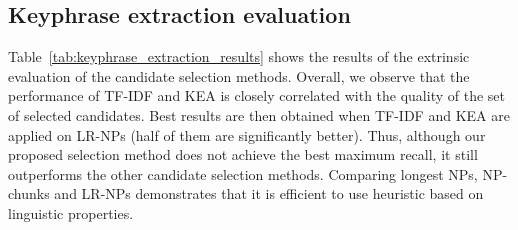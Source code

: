     \subsection{Keyphrase extraction evaluation}
    \label{subsec:keyphrase_extraction_evaluation}
        Table~\ref{tab:keyphrase_extraction_results} shows the results of the extrinsic evaluation of the candidate selection methods.
        Overall, we observe that the performance of TF-IDF and KEA is closely correlated with the quality of the set of selected candidates.
        Best results are then obtained when TF-IDF and KEA are applied on LR-NPs (half of them are significantly better).
        Thus, although our proposed selection method does not achieve the best maximum recall, it still outperforms the other candidate selection  methods.
        Comparing longest NPs, NP-chunks and LR-NPs demonstrates that it is efficient to use heuristic based on linguistic properties.
